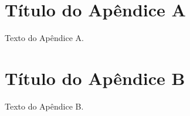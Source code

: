 
\begin{apendicesenv}
	
	\partapendices* %
	
	\chapter{Título do Apêndice A}
	
	Texto do Apêndice A.
	
	
	
	\chapter{Título do Apêndice B}
	
	Texto do Apêndice B.
	

	
	
	
\end{apendicesenv}
